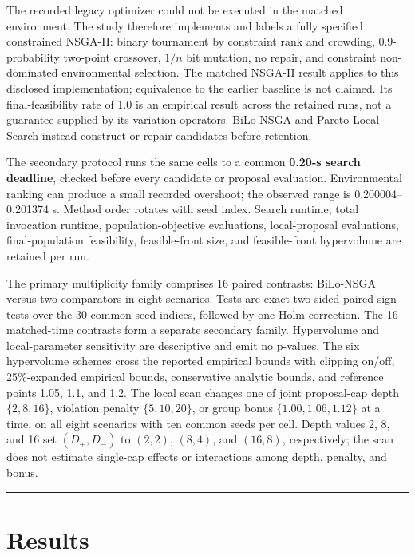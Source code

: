 \documentclass[applsci,article,submit,moreauthors]{Definitions/mdpi}
\begin{document}
The recorded legacy optimizer could not be executed in the matched environment. The study therefore implements and labels a fully specified constrained NSGA-II: binary tournament by constraint rank and crowding, 0.9-probability two-point crossover, \(1/n\) bit mutation, no repair, and constraint non-dominated environmental selection. The matched NSGA-II result applies to this disclosed implementation; equivalence to the earlier baseline is not claimed. Its final-feasibility rate of 1.0 is an empirical result across the retained runs, not a guarantee supplied by its variation operators. BiLo-NSGA and Pareto Local Search instead construct or repair candidates before retention.

The secondary protocol runs the same cells to a common \textbf{0.20-s search deadline}, checked before every candidate or proposal evaluation. Environmental ranking can produce a small recorded overshoot; the observed range is 0.200004--0.201374 s. Method order rotates with seed index. Search runtime, total invocation runtime, population-objective evaluations, local-proposal evaluations, final-population feasibility, feasible-front size, and feasible-front hypervolume are retained per run.

The primary multiplicity family comprises 16 paired contrasts: BiLo-NSGA versus two comparators in eight scenarios. Tests are exact two-sided paired sign tests over the 30 common seed indices, followed by one Holm correction. The 16 matched-time contrasts form a separate secondary family. Hypervolume and local-parameter sensitivity are descriptive and emit no p-values. The six hypervolume schemes cross the reported empirical bounds with clipping on/off, 25\%-expanded empirical bounds, conservative analytic bounds, and reference points 1.05, 1.1, and 1.2. The local scan changes one of joint proposal-cap depth \(\{2,8,16\}\), violation penalty \(\{5,10,20\}\), or group bonus \(\{1.00,1.06,1.12\}\) at a time, on all eight scenarios with ten common seeds per cell. Depth values 2, 8, and 16 set \((D_+,D_-)\) to \((2,2)\), \((8,4)\), and \((16,8)\), respectively; the scan does not estimate single-cap effects or interactions among depth, penalty, and bonus.

\begin{center}\rule{0.5\linewidth}{0.5pt}\end{center}

\section{Results}\label{results}
\end{document}
